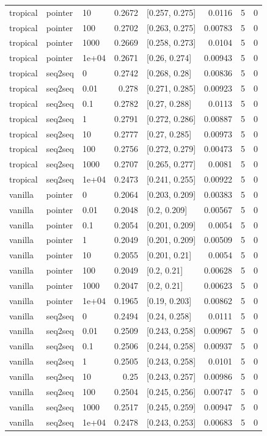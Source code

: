 \documentclass[10pt]{article}
\begin{document}
{\begin{longtable}{lllrlrrr}
tropical & pointer & 10 & 0.2672 & [0.257, 0.275] & 0.0116 & 5 & 0\\
tropical & pointer & 100 & 0.2702 & [0.263, 0.275] & 0.00783 & 5 & 0\\
tropical & pointer & 1000 & 0.2669 & [0.258, 0.273] & 0.0104 & 5 & 0\\
tropical & pointer & 1e+04 & 0.2671 & [0.26, 0.274] & 0.00943 & 5 & 0\\
tropical & seq2seq & 0 & 0.2742 & [0.268, 0.28] & 0.00836 & 5 & 0\\
tropical & seq2seq & 0.01 & 0.278 & [0.271, 0.285] & 0.00923 & 5 & 0\\
tropical & seq2seq & 0.1 & 0.2782 & [0.27, 0.288] & 0.0113 & 5 & 0\\
tropical & seq2seq & 1 & 0.2791 & [0.272, 0.286] & 0.00887 & 5 & 0\\
tropical & seq2seq & 10 & 0.2777 & [0.27, 0.285] & 0.00973 & 5 & 0\\
tropical & seq2seq & 100 & 0.2756 & [0.272, 0.279] & 0.00473 & 5 & 0\\
tropical & seq2seq & 1000 & 0.2707 & [0.265, 0.277] & 0.0081 & 5 & 0\\
tropical & seq2seq & 1e+04 & 0.2473 & [0.241, 0.255] & 0.00922 & 5 & 0\\
vanilla & pointer & 0 & 0.2064 & [0.203, 0.209] & 0.00383 & 5 & 0\\
vanilla & pointer & 0.01 & 0.2048 & [0.2, 0.209] & 0.00567 & 5 & 0\\
vanilla & pointer & 0.1 & 0.2054 & [0.201, 0.209] & 0.0054 & 5 & 0\\
vanilla & pointer & 1 & 0.2049 & [0.201, 0.209] & 0.00509 & 5 & 0\\
vanilla & pointer & 10 & 0.2055 & [0.201, 0.21] & 0.0054 & 5 & 0\\
vanilla & pointer & 100 & 0.2049 & [0.2, 0.21] & 0.00628 & 5 & 0\\
vanilla & pointer & 1000 & 0.2047 & [0.2, 0.21] & 0.00623 & 5 & 0\\
vanilla & pointer & 1e+04 & 0.1965 & [0.19, 0.203] & 0.00862 & 5 & 0\\
vanilla & seq2seq & 0 & 0.2494 & [0.24, 0.258] & 0.0111 & 5 & 0\\
vanilla & seq2seq & 0.01 & 0.2509 & [0.243, 0.258] & 0.00967 & 5 & 0\\
vanilla & seq2seq & 0.1 & 0.2506 & [0.244, 0.258] & 0.00937 & 5 & 0\\
vanilla & seq2seq & 1 & 0.2505 & [0.243, 0.258] & 0.0101 & 5 & 0\\
vanilla & seq2seq & 10 & 0.25 & [0.243, 0.257] & 0.00986 & 5 & 0\\
vanilla & seq2seq & 100 & 0.2504 & [0.245, 0.256] & 0.00747 & 5 & 0\\
vanilla & seq2seq & 1000 & 0.2517 & [0.245, 0.259] & 0.00947 & 5 & 0\\
vanilla & seq2seq & 1e+04 & 0.2478 & [0.243, 0.253] & 0.00683 & 5 & 0\\
\bottomrule
\end{longtable}
}
\end{document}

